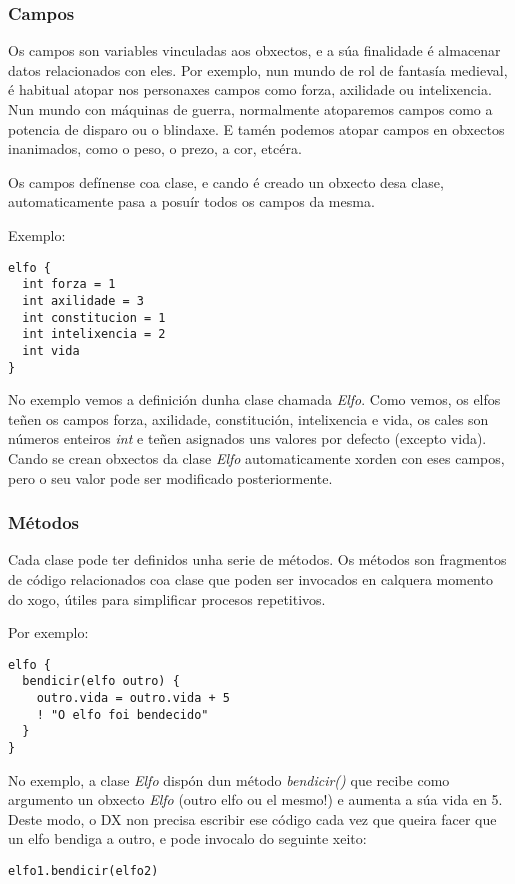 \subsubsection{Campos}
Os campos son variables vinculadas aos obxectos, e a súa finalidade é
almacenar datos relacionados con eles. Por exemplo, nun mundo de rol de fantasía
medieval, é habitual atopar nos personaxes campos como forza, axilidade ou
intelixencia. Nun mundo con máquinas de guerra, normalmente atoparemos campos
como a potencia de disparo ou o blindaxe. E tamén podemos atopar campos en
obxectos inanimados, como o peso, o prezo, a cor, etcéra.
\par
Os campos defínense coa clase, e cando é creado un obxecto desa clase,
automaticamente pasa a posuír todos os campos da mesma.
\par
Exemplo:
\begin{lstlisting}
elfo {
  int forza = 1
  int axilidade = 3
  int constitucion = 1
  int intelixencia = 2
  int vida
}
\end{lstlisting}
\par No exemplo vemos a definición dunha clase chamada {\it Elfo}. Como vemos,
os elfos teñen os campos forza, axilidade, constitución, intelixencia e vida,
os cales son números enteiros {\it int} e teñen asignados uns valores por
defecto (excepto vida).
Cando se crean obxectos da clase {\it Elfo} automaticamente xorden con eses
campos, pero o seu valor pode ser modificado posteriormente.

\subsubsection{Métodos}
\label{subsec:metodos}
Cada clase pode ter definidos unha serie de métodos. Os métodos son fragmentos
de código relacionados coa clase que poden ser invocados en calquera momento do
xogo, útiles para simplificar procesos repetitivos.
\par Por exemplo:
\begin{lstlisting}
elfo {
  bendicir(elfo outro) {
    outro.vida = outro.vida + 5
    ! "O elfo foi bendecido"
  }
}
\end{lstlisting}
\par No exemplo, a clase {\it Elfo} dispón dun método {\it bendicir()} que recibe
como argumento un obxecto {\it Elfo} (outro elfo ou el mesmo!) e aumenta a súa
vida en 5. Deste modo, o DX non precisa escribir ese código cada vez que queira
facer que un elfo bendiga a outro, e pode invocalo do seguinte xeito:
\begin{lstlisting}
elfo1.bendicir(elfo2)
\end{lstlisting}
